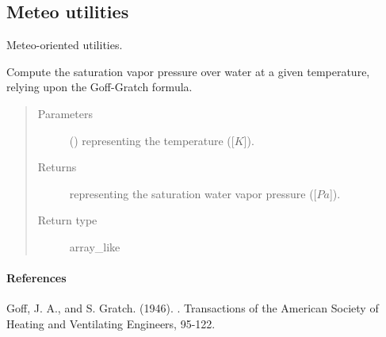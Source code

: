 \documentclass[letterpaper,10pt,english]{sphinxmanual}
\begin{document}
\subsection{Meteo utilities}
\label{\detokenize{api:meteo-utilities}}\label{\detokenize{api:module-tasmania.utils.utils_meteo}}
Meteo-oriented utilities.

\begin{fulllineitems}
\label{\detokenize{api:tasmania.utils.utils_meteo.apply_goff_gratch_formula}}
Compute the saturation vapor pressure over water at a given temperature, relying upon the Goff-Gratch formula.
\begin{quote}\begin{description}
\item[{Parameters}] \leavevmode
{} () \textendash{}  representing the temperature ({[}\(K\){]}).

\item[{Returns}] \leavevmode
{} representing the saturation water vapor pressure ({[}\(Pa\){]}).

\item[{Return type}] \leavevmode
array\_like

\end{description}\end{quote}
\paragraph{References}

Goff, J. A., and S. Gratch. (1946). .              Transactions of the American Society of Heating and Ventilating Engineers, 95-122.

\end{fulllineitems}

\end{document}
